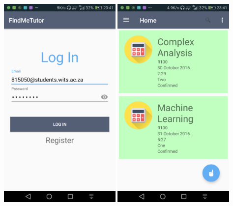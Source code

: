 \documentclass[12pt]{article}
\begin{document}
\begin{flushleft}
\includegraphics[width=60mm]{./Sprint3Models/Screenshot/login.png}
\includegraphics[width=60mm]{./Sprint3Models/Screenshot/home.png}
\end{flushleft}
\end{document}
